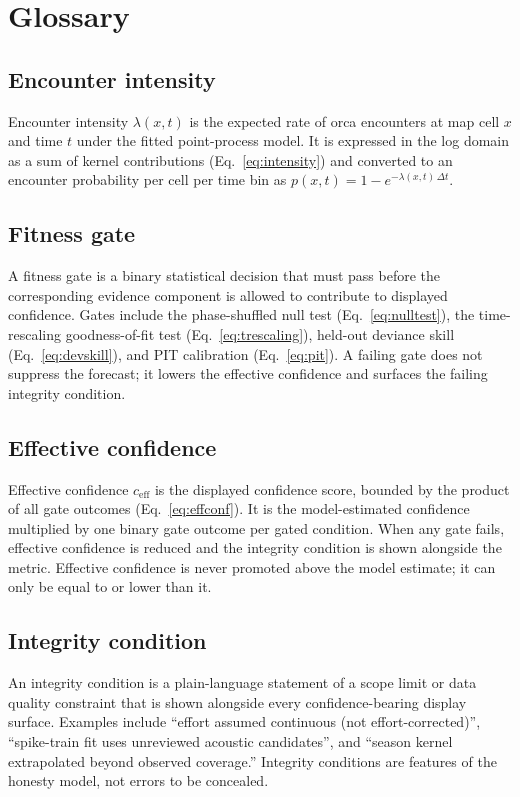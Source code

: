 \section*{Glossary}

\subsection*{Encounter intensity}
Encounter intensity $\lambda(x,t)$ is the expected rate of orca encounters at map cell $x$ and time $t$ under the fitted point-process model. It is expressed in the log domain as a sum of kernel contributions (Eq.~\ref{eq:intensity}) and converted to an encounter probability per cell per time bin as $p(x,t) = 1 - e^{-\lambda(x,t)\,\Delta t}$.

\subsection*{Fitness gate}
A fitness gate is a binary statistical decision that must pass before the corresponding evidence component is allowed to contribute to displayed confidence. Gates include the phase-shuffled null test (Eq.~\ref{eq:nulltest}), the time-rescaling goodness-of-fit test (Eq.~\ref{eq:trescaling}), held-out deviance skill (Eq.~\ref{eq:devskill}), and PIT calibration (Eq.~\ref{eq:pit}). A failing gate does not suppress the forecast; it lowers the effective confidence and surfaces the failing integrity condition.

\subsection*{Effective confidence}
Effective confidence $c_\mathrm{eff}$ is the displayed confidence score, bounded by the product of all gate outcomes (Eq.~\ref{eq:effconf}). It is the model-estimated confidence multiplied by one binary gate outcome per gated condition. When any gate fails, effective confidence is reduced and the integrity condition is shown alongside the metric. Effective confidence is never promoted above the model estimate; it can only be equal to or lower than it.

\subsection*{Integrity condition}
An integrity condition is a plain-language statement of a scope limit or data quality constraint that is shown alongside every confidence-bearing display surface. Examples include ``effort assumed continuous (not effort-corrected)'', ``spike-train fit uses unreviewed acoustic candidates'', and ``season kernel extrapolated beyond observed coverage.'' Integrity conditions are features of the honesty model, not errors to be concealed.

